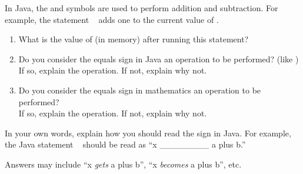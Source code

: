 \Q In Java, the \java{+} and \java{-} symbols are used to perform addition and subtraction. For example, the statement ~ adds one to the current value of .

\begin{enumerate}

\item What is the value of  (in memory) after running this statement?

\item Do you consider the equals sign in Java an operation to be performed? (like \java{+})
\\ If so, explain the operation. If not, explain why not.


\item Do you consider the equals sign in mathematics an operation to be performed?
\\ If so, explain the operation. If not, explain why not.


\end{enumerate}


\Q \label{xgets}
In your own words, explain how you should read the \java{=} sign in Java.
For example, the Java statement ~ should be read as ``x \_\_\_\_\_\_\_\_ a plus b.''

\begin{answer}
Answers may include ``x \emph{gets} a plus b'', ``x \emph{becomes} a plus b'', etc.
\end{answer}
